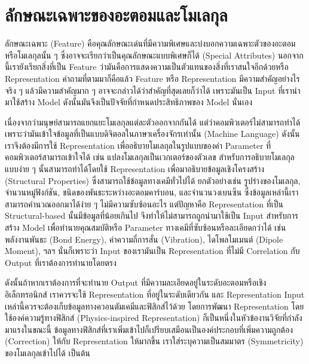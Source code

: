 

\chapter{ลักษณะเฉพาะของอะตอมและโมเลกุล}
\label{ch:feature}

ลักษณะเฉพาะ (Feature) คือคุณลักษณะเด่นที่มีความพิเศษและบ่งบอกความเฉพาะตัวของอะตอมหรือโมเลกุลนั้น ๆ ซึ่งอาจจะเรียกว่าเป็นคุณลักษณะแบบพิเศษก็ได้ 
(Special Attributes) นอกจากนี้เรายังเรียกสิ่งที่เป็น Feature ว่ามันคือการแสดงความเป็นตัวแทนของสิ่งที่เราสนใจอีกด้วยหรือ Representation
คำถามที่ตามมาก็คือแล้ว Feature หรือ Representation มีความสำคัญอย่างไร จริง ๆ แล้วมีความสำคัญมาก ๆ อาจจะกล่าวได้ว่าสำคัญที่สุดเลยก็ว่าได้ 
เพราะมันเป็น Input ที่เรานำมาใช้สร้าง Model ดังนั้นมันจึงเป็นปัจจัยที่กำหนดประสิทธิภาพของ Model นั่นเอง 

เนื่องจากว่ามนุษย์สามารถแยกแยะโมเลกุลแต่ละตัวออกจากกันได้ แต่ว่าคอมพิวเตอร์ไม่สามารถทำได้ เพราะว่ามันเข้าใจข้อมูลที่เป็นแบบดิจิตอลในภาษาเครื่องจักรเท่านั้น (Machine Language)
ดังนั้นเราจึงต้องมีการใช้ Representation เพื่ออธิบายโมเลกุลในรูปแบบของค่า Parameter ที่คอมพิวเตอร์สามารถเข้าใจได้ เช่น แปลงโมเลกุลเป็นเวกเตอร์ของตัวเลข 
สำหรับการอธิบายโมเลกุลแบบง่าย ๆ นั้นสามารถทำได้โดยใช้ Representation เพื่อมาอธิบายข้อมูลเชิงโครงสร้าง (Structural Properties) 
ซึ่งสามารถใช้ข้อมูลทางเคมีทั่วไปได้ ยกตัวอย่างเช่น รูปร่างของโมเลกุล, จำนวนหมู่ฟังก์ชัน, ชนิดของพันธะระหว่างอะตอมคาร์บอน, และจำนวนวงเบนซีน 
ซึ่งข้อมูลเหล่านี้เราสามารถคำนวณออกมาได้ง่าย ๆ ไม่มีความซับซ้อนอะไร แต่ปัญหาคือ Representation ที่เป็น Structural-based นั้นมีข้อมูลที่น้อยเกินไป
จึงทำให้ไม่สามารถถูกนำมาใช้เป็น Input สำหรับการสร้าง Model เพื่อทำนายคุณสมบัติหรือ Parameter ทางเคมีที่ซับซ้อนหรือละเอียดกว่าได้ เช่น 
พลังงานพันธะ (Bond Energy), ค่าความถี่การสั่น (Vibration), ไดโพลโมเมนต์ (Dipole Moment), ฯลฯ 
นั่นก็เพราะว่า Input ของเรามันเป็น Representation ที่ไม่มี Correlation กับ Output ที่เราต้องการทำนายโดยตรง

ดังนั้นถ้าหากเราต้องการที่จะทำนาย Output ที่มีความละเอียดอยู่ในระดับอะตอมหรือเชิงอิเล็กทรอนิกส์ เราควรจะใช้ Representation ที่อยู่ในระดับเดียวกัน 
และ Representation Input เหล่านี้ควรจะต้องเก็บข้อมูลทางควอนตัมเคมีและฟิสิกส์ไว้ด้วย โดยการพัฒนา Representation โดยใช้องค์ความรู้ทางฟิสิกส์
(Physics-inspired Representation) ก็เป็นหนึ่งในหัวข้องานวิจัยที่กำลังมาแรงในขณะนี้ ข้อมูลทางฟิสิกส์ที่เราเพิ่มเข้าไปก็เปรียบเสมือนเป็นองค์ประกอบที่เพิ่มความถูกต้อง
(Correction) ให้กับ Representation ให้มากขึ้น เราใส่ระบุความเป็นสมมาตร (Symmetricity) ของโมเลกุลเข้าไปได้ เป็นต้น 

